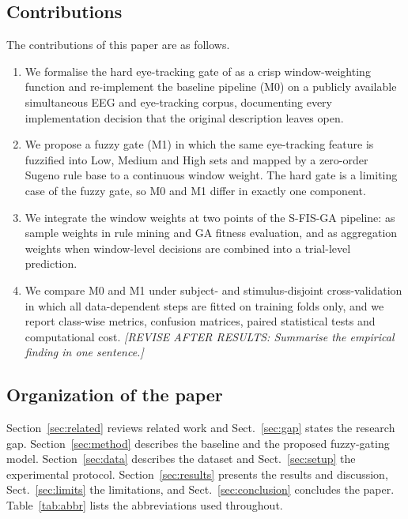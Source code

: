 \documentclass[11pt,a4paper]{article}
\newcommand{\revise}[1]{\textcolor{orange!80!black}{\textit{[REVISE AFTER RESULTS: #1]}}}
\begin{document}
\subsection{Contributions}
The contributions of this paper are as follows.
\begin{enumerate}
  \item We formalise the hard eye-tracking gate of \cite{FarhadiSedehi2024a} as a crisp window-weighting function and re-implement the baseline pipeline (M0) on a publicly available simultaneous EEG and eye-tracking corpus, documenting every implementation decision that the original description leaves open.
  \item We propose a fuzzy gate (M1) in which the same eye-tracking feature is fuzzified into Low, Medium and High sets and mapped by a zero-order Sugeno rule base to a continuous window weight. The hard gate is a limiting case of the fuzzy gate, so M0 and M1 differ in exactly one component.
  \item We integrate the window weights at two points of the S-FIS-GA pipeline: as sample weights in rule mining and GA fitness evaluation, and as aggregation weights when window-level decisions are combined into a trial-level prediction.
  \item We compare M0 and M1 under subject- and stimulus-disjoint cross-validation in which all data-dependent steps are fitted on training folds only, and we report class-wise metrics, confusion matrices, paired statistical tests and computational cost. \revise{Summarise the empirical finding in one sentence.}
\end{enumerate}

\subsection{Organization of the paper}
Section~\ref{sec:related} reviews related work and Sect.~\ref{sec:gap} states the research gap. Section~\ref{sec:method} describes the baseline and the proposed fuzzy-gating model. Section~\ref{sec:data} describes the dataset and Sect.~\ref{sec:setup} the experimental protocol. Section~\ref{sec:results} presents the results and discussion, Sect.~\ref{sec:limits} the limitations, and Sect.~\ref{sec:conclusion} concludes the paper. Table~\ref{tab:abbr} lists the abbreviations used throughout.
\end{document}
